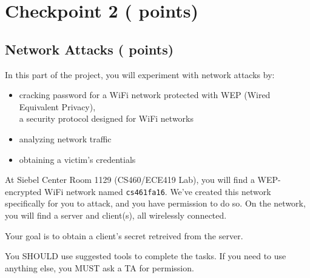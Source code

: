   \setcounter{pts-wep}{15}
 \setcounter{pts-clientip}{5}
 \setcounter{pts-serverip}{5}
 \setcounter{pts-protocol}{12}
 \setcounter{pts-priv}{5}
 \setcounter{pts-cred}{20}
 \setcounter{pts-secret}{6}
 \setcounter{pts-jailtime}{2}
\setcounter{pts-cp2.1}{
    \value{pts-wep}+\value{pts-clientip}+\value{pts-serverip}+\value{pts-protocol}+\value{pts-priv}+\value{pts-cred}+\value{pts-secret}+\value{pts-jailtime}
}
 \setcounter{pts-cp2.2}{30}
\setcounter{pts-cp2}{\value{pts-cp2.1}+\value{pts-cp2.2}}

\section{Checkpoint 2 ( points)}
\label{sec:cp2}

\subsection{Network Attacks ( points)}
\label{sec:cp2.1}

In this part of the project, you will experiment with network attacks by:

\begin{itemize}[nosep]
  \item cracking password for a WiFi network protected with WEP (Wired Equivalent Privacy),\\a security protocol designed for WiFi networks
  \item analyzing network traffic
  \item obtaining a victim's credentials
\end{itemize}

\medskip

At Siebel Center Room 1129 (CS460/ECE419 Lab), you will find a WEP-encrypted WiFi network named \texttt{cs461fa16}.
We've created this network specifically for you to attack, and you have permission to do so.
On the network, you will find a server and client(s), all wirelessly connected.

\medskip

Your goal is to obtain a client's secret retreived from the server.

\medskip

You SHOULD use suggested tools to complete the tasks.
If you need to use anything else, you MUST ask a TA for permission.

